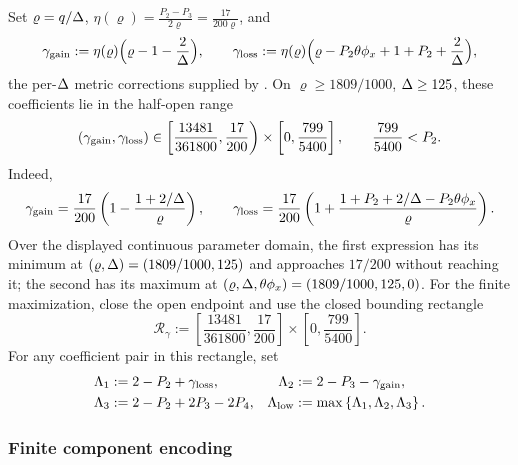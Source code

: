 Set $\varrho=q/\Delta$, $\eta(\varrho)=\frac{P_2-P_3}{2\varrho}=\frac{17}{200\varrho}$, and
\begin{equation}\label{eq:cv-gammas}
  \gamma_{\rm gain}:=\eta(\varrho)
     \Bigl(\varrho-1-\frac2{\Delta}\Bigr),\qquad
  \gamma_{\rm loss}:=\eta(\varrho)
     \Bigl(\varrho-P_2\theta\phi_x+1+P_2+\frac2{\Delta}\Bigr),
\end{equation}
the per-$\Delta$ metric corrections supplied by
. On $\varrho\ge1809/1000$, $\Delta\ge125$,
these coefficients lie in the half-open range
\[
  (\gamma_{\rm gain},\gamma_{\rm loss})\in
  \left[\frac{13481}{361800},\frac{17}{200}\right)
  \times\left[0,\frac{799}{5400}\right],
  \qquad \frac{799}{5400}<P_2.
\]
Indeed,
\[
 \gamma_{\rm gain}=\frac{17}{200}
   \left(1-\frac{1+2/\Delta}{\varrho}\right),\qquad
 \gamma_{\rm loss}=\frac{17}{200}
   \left(1+\frac{1+P_2+2/\Delta-P_2\theta\phi_x}{\varrho}\right).
\]
Over the displayed continuous parameter domain, the first expression has
its minimum at
$(\varrho,\Delta)=(1809/1000,125)$ and approaches $17/200$ without reaching
it; the second has its maximum at
$(\varrho,\Delta,\theta\phi_x)=(1809/1000,125,0)$.  For the finite
maximization, close the open endpoint and use the
closed bounding rectangle
\begin{equation}\label{eq:cv-gamma-box}
  \mathcal R_\gamma:=
  \left[\frac{13481}{361800},\frac{17}{200}\right]
  \times\left[0,\frac{799}{5400}\right].
\end{equation}
For any coefficient pair in this rectangle, set
\begin{equation}\label{eq:cv-lambda-rates}
\begin{aligned}
 \Lambda_1&:=2-P_2+\gamma_{\rm loss},&
 \Lambda_2&:=2-P_3-\gamma_{\rm gain},\\
 \Lambda_3&:=2-P_2+2P_3-2P_4,&
 \Lambda_{\rm low}&:=\max\left\{\Lambda_1,\Lambda_2,\Lambda_3\right\}.
\end{aligned}
\end{equation}

\subsubsection{Finite component encoding}

